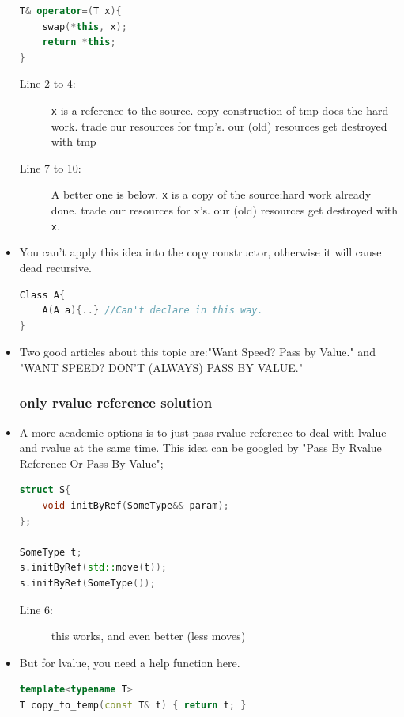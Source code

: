 \documentclass[a4paper,11pt,twoside]{book}
\begin{document}
\begin{itemize}
\begin{lstlisting}[frame=single, language=c++]
T& operator=(T x){ 
	swap(*this, x);
	return *this;   
}
\end{lstlisting}
\begin{description}
	\item[Line 2 to 4:] \texttt{x} is a reference to the source. copy construction of tmp does the hard work. trade our resources for tmp's. our (old) resources get destroyed with tmp 
	
	\item[Line 7 to 10:] A better one is below. \texttt{x} is a copy of the source;hard work already done. trade our resources for x's. our (old) resources get destroyed with \texttt{x}.
\end{description}

\item You can't apply this idea into the copy constructor, otherwise it will cause dead recursive.
\begin{lstlisting}[frame=single, language=c++]
Class A{
	A(A a){..} //Can't declare in this way.
}
\end{lstlisting}

\item Two good articles about this topic are:"Want Speed? Pass by Value." and "WANT SPEED? DON'T (ALWAYS) PASS BY VALUE."

\subsubsection{only rvalue  reference solution}
\item A more academic options is to just pass rvalue  reference to deal with lvalue and rvalue at the same time. This idea can be googled by "Pass By Rvalue Reference Or Pass By Value";
\begin{lstlisting}[frame=single, language=c++]
struct S{
    void initByRef(SomeType&& param);
};

SomeType t;
s.initByRef(std::move(t)); 
s.initByRef(SomeType()); 
\end{lstlisting}
\begin{description}
	\item[Line 6:] this works, and even better (less moves)
\end{description}

\item But for lvalue, you need a help function here.
\begin{lstlisting}[frame=single, language=c++]
template<typename T>
T copy_to_temp(const T& t) { return t; }


\end{lstlisting}
\end{itemize}
\end{document}
